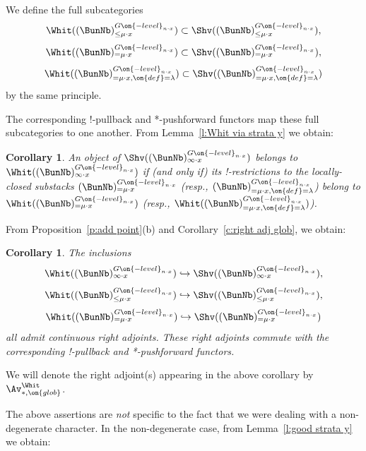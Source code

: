 \documentclass[9pt]{amsart}
\newtheorem{cor}[subsubsection]{Corollary}
\theoremstyle{definition}
\theoremstyle{remark}
\newcommand{\lemref}[1]{Lemma~\ref{#1}}
\newcommand{\propref}[1]{Proposition~\ref{#1}}
\newcommand{\corref}[1]{Corollary~\ref{#1}}
\numberwithin{equation}{section}
\begin{document}
\sssec{}

We define the full subcategories
$$\Whit((\BunNb)^{G\on{-level}_{n\cdot x}}_{\leq \mu\cdot x})\subset \Shv((\BunNb)^{G\on{-level}_{n\cdot x}}_{\leq \mu\cdot x}),$$
$$\Whit((\BunNb)^{G\on{-level}_{n\cdot x}}_{=\mu\cdot x})\subset \Shv((\BunNb)^{G\on{-level}_{n\cdot x}}_{=\mu\cdot x}),$$
$$\Whit((\BunNb)^{G\on{-level}_{n\cdot x}}_{=\mu\cdot x,\on{def}=\lambda})\subset 
\Shv((\BunNb)^{G\on{-level}_{n\cdot x}}_{=\mu\cdot x,\on{def}=\lambda})$$
by the same principle.

\medskip

The corresponding !-pullback and *-pushforward functors map these full subcategories to one another.
From \lemref{l:Whit via strata y} we obtain:

\begin{cor} \label{c:Whit via strata}
An object of $\Shv((\BunNb)_{\infty\cdot x}^{G\on{-level}_{n\cdot x}})$ belongs to
$\Whit((\BunNb)_{\infty\cdot x}^{G\on{-level}_{n\cdot x}})$ if (and only if) its !-restrictions to
the locally-closed substacks $(\BunNb)_{=\mu\cdot x}^{G\on{-level}_{n\cdot x}}$
(resp., $(\BunNb)_{=\mu\cdot x,\on{def}=\lambda}^{G\on{-level}_{n\cdot x}}$)
belong to $\Whit((\BunNb)_{=\mu\cdot x}^{G\on{-level}_{n\cdot x}})$
(resp., $\Whit((\BunNb)_{=\mu\cdot x,\on{def}=\lambda}^{G\on{-level}_{n\cdot x}})$).
\end{cor}

From \propref{p:add point}(b) and \corref{c:right adj glob}, we obtain: 

\begin{cor}  
The inclusions
$$\Whit((\BunNb)_{\infty\cdot x}^{G\on{-level}_{n\cdot x}})\hookrightarrow
\Shv((\BunNb)_{\infty\cdot x}^{G\on{-level}_{n\cdot x}}),$$
$$\Whit((\BunNb)_{\leq \mu\cdot x}^{G\on{-level}_{n\cdot x}})\hookrightarrow
\Shv((\BunNb)_{\leq \mu\cdot x}^{G\on{-level}_{n\cdot x}}),$$
$$\Whit((\BunNb)_{=\mu\cdot x}^{G\on{-level}_{n\cdot x}})\hookrightarrow
\Shv((\BunNb)_{=\mu\cdot x}^{G\on{-level}_{n\cdot x}})$$
all admit continuous right adjoints. These right adjoints commute with the corresponding !-pullback and
*-pushforward functors. 
\end{cor}

We will denote the right adjoint(s) appearing in the above corollary by $\Av_{*,\on{glob}}^{\Whit}$. 

\sssec{}

The above assertions are \emph{not} specific to the fact that we were dealing with a non-degenerate character.
In the non-degenerate case, from \lemref{l:good strata y} we obtain:
\end{document}

